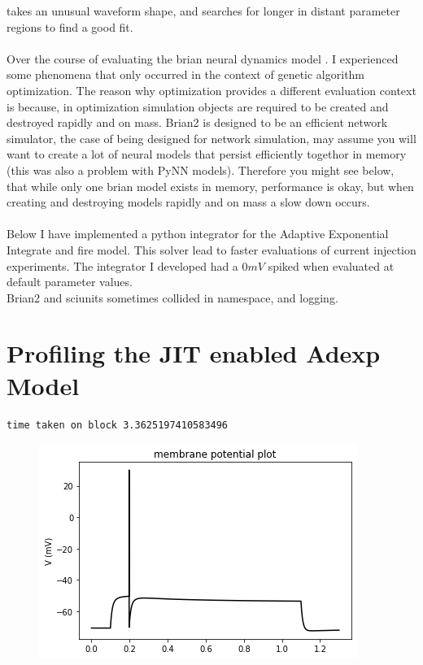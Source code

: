 takes an unusual waveform shape, and searches for longer in distant
parameter regions to find a good fit.\\
\\
Over  the course of evaluating the brian neural dynamics model \cite{gerstner2014neuronal}. I experienced some phenomena that only occurred in the context of genetic algorithm optimization. The reason why optimization provides a different evaluation context is because, in optimization simulation objects are required to be created and destroyed rapidly and on mass. Brian2 is designed to be an efficient network simulator, the case of being designed for network simulation, may assume you will want to create a lot of neural models that persist efficiently togethor in memory (this was also a problem with PyNN models). Therefore you might see below, that while only one brian model exists in memory, performance is okay, but when creating and destroying models rapidly and on mass a slow down occurs.\\
\\
Below I have implemented a python integrator for the Adaptive
Exponential Integrate and fire model. This solver lead to faster
evaluations of current injection experiments. The integrator I developed
had a $0mV$ spiked when evaluated at default
parameter values.\\


Brian2 and sciunits sometimes collided in namespace, and logging.

\section{Profiling the JIT enabled Adexp Model}

    \begin{Verbatim}
time taken on block 3.3625197410583496
    \end{Verbatim}


\begin{figure}    
\begin{center}
\includegraphics[width=1.1\linewidth]{figures/backend_check_files/backend_check_6_2.png}
\caption{}

\end{center}
\end{figure}

